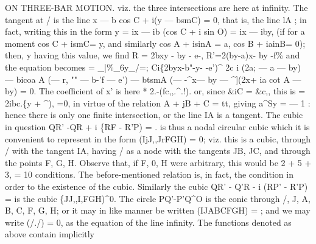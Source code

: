 \documentclass[11pt,a4paper]{book}
\begin{document}
ON THREE-BAR MOTION.
viz.
the
three
intersections
are
here
at
infinity.
The
tangent
at
/
is
the
line
x --- b cos C + i(y --- bsmC) = 0, that
is, the
line lA
;
in
fact, writing
this
in the
form
y = ix --- ib (cos C + i sin O) = ix --- iby,
(if
for a moment
cos C + ismC= y, and
similarly
cos A + isinA = a,
cos B + iainB= 0);
then, y
having
this
value, we
find
R = 2bxy - by - e-, R'=2(by-a)x- by -f\%
and
the equation becomes
= \_|\%\_6y\_/=;
Ci\{2byx-b"-y- -e')\textasciicircum{}
2c
i (2a; --- a --- by)
--- bicoa A (---
r,
"" --- b-'f --- e')
--- btsmA (--- -\textasciicircum{}x--- by --- \textasciicircum{}](2x+ ia cot A --- by) = 0.
The
coefficient of x'
is here
*
2.-(fc,,.\textasciicircum{}.!).
or, since
\&iC = \&c,,
this
is
= 2ibc.\{y + \textasciicircum{}),
=0,
in
virtue
of
the
relation A + jB + C = tt,
giving
a\textasciicircum{}Sy = --- 1
:
hence
there
is
only
one
finite
intersection, or the
line IA
is a tangent.
The cubic
in question
QR' -QR + i \{RF - R'P) =
.
is thus a nodal
circular cubic which
it
is convenient
to represent
in the form
(IjJ,,JrFGH) = 0;
viz.
this
is
a
cubic,
through /
with
the
tangent IA, having /
as
a
node
with
the
tangents
JB,
JC,
and
through
the
points
F,
G,
H.
Observe
that,
if
F,
0, H
were
arbitrary,
this
would
be
2 + 5 + 3, = 10 conditions.
The before-mentioned
relation
is, in
fact, the condition
in order
to the existence of the
cubic.
Similarly the cubic
QR' - Q'R - i (RP' - R'P) =
is the cubic
\{JJ,,I,FGH)\textasciicircum{}0.
The
circle PQ'-P'Q\textasciicircum{}O
is
the
conic
through
/,
J,
A,
B,
C,
F,
G, H;
or
it may
in
like
manner
be
written (IJABCFGH) =
;
and
we
may
write
(/./) = 0,
as
the
equation
of
the
line
infinity.
The
functions
denoted
as
above
contain
implicitly
\end{document}
